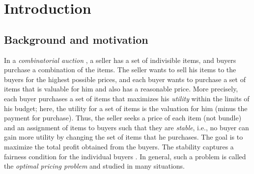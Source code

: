 \documentclass[letterpaper]{article}
\theoremstyle{definition}
\newcommand{\COMM}[2]{{
\begin{CJK}{UTF8}{ipxm}
\ifthenelse{\equal{#1}{TM}}{\color{blue}}{
\ifthenelse{\equal{#1}{YK}}{\color{red}}{
\ifthenelse{\equal{#1}{HS}}{\color{cyan}}{
\ifthenelse{\equal{#1}{KK}}{\color{magenta}}}}}
[#1: #2]
\end{CJK}
}}
\begin{document}
\section{Introduction}
\label{sec:introduction}

\subsection{Background and motivation}
In a \emph{combinatorial auction} \cite{nisan2007algorithmic11,cramton2006combinatorial},
a seller has a set of indivisible items, and buyers purchase a combination of the items.
The seller wants to sell his items to the buyers for the highest possible prices, and
each buyer wants to purchase a set of items that is valuable for him and also has a reasonable price.
More precisely, each buyer purchases a set of items that maximizes his \emph{utility} within the limits of his budget; here, the utility for a set of items is the valuation for him (minus the payment for purchase).
Thus, the seller seeks a price of each item (not bundle) and an assignment of items to buyers such that they are \emph{stable}, i.e., no buyer can gain more utility by changing the set of items that he purchases.
The goal is to maximize the total profit obtained from the buyers. 
The stability captures a fairness condition for the individual buyers \cite{goldberg2003envy,guruswami2005profit,cheung2008approximation,anshelevich2015envy}. %
In general, such a problem is called the \emph{optimal pricing problem} and studied in many situations.


\end{document}
